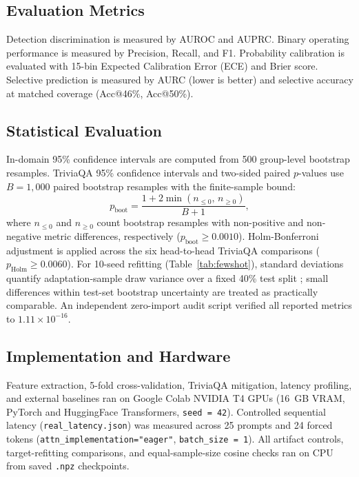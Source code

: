 \documentclass{ieeeaccess}
\begin{document}
\subsection{Evaluation Metrics}
Detection discrimination is measured by AUROC and AUPRC. Binary operating performance is measured by Precision, Recall, and F1. Probability calibration is evaluated with 15-bin Expected Calibration Error (ECE) and Brier score. Selective prediction is measured by AURC (lower is better) and selective accuracy at matched coverage (Acc@46\%, Acc@50\%).

\subsection{Statistical Evaluation}
In-domain 95\% confidence intervals are computed from 500 group-level bootstrap resamples. TriviaQA 95\% confidence intervals and two-sided paired $p$-values use $B = 1{,}000$ paired bootstrap resamples with the finite-sample bound:
\begin{equation}
p_{\text{boot}} = \frac{1 + 2 \min(n_{\le 0},\, n_{\ge 0})}{B + 1},
\label{eq:pboot}
\end{equation}
where $n_{\le 0}$ and $n_{\ge 0}$ count bootstrap resamples with non-positive and non-negative metric differences, respectively ($p_{\text{boot}} \ge 0.0010$). Holm-Bonferroni adjustment is applied across the six head-to-head TriviaQA comparisons ($p_{\text{Holm}} \ge 0.0060$). For 10-seed refitting (Table~\ref{tab:fewshot}), standard deviations quantify adaptation-sample draw variance over a fixed 40\% test split \cite{nadeau2003inference}; small differences within test-set bootstrap uncertainty are treated as practically comparable. An independent zero-import audit script verified all reported metrics to $1.11 \times 10^{-16}$.

\subsection{Implementation and Hardware}
Feature extraction, 5-fold cross-validation, TriviaQA mitigation, latency profiling, and external baselines ran on Google Colab NVIDIA T4 GPUs (16~GB VRAM, PyTorch and HuggingFace Transformers, \texttt{seed = 42}). Controlled sequential latency (\texttt{real\_latency.json}) was measured across 25 prompts and 24 forced tokens (\texttt{attn\_implementation="eager"}, \texttt{batch\_size = 1}). All artifact controls, target-refitting comparisons, and equal-sample-size cosine checks ran on CPU from saved \texttt{.npz} checkpoints.
\end{document}
